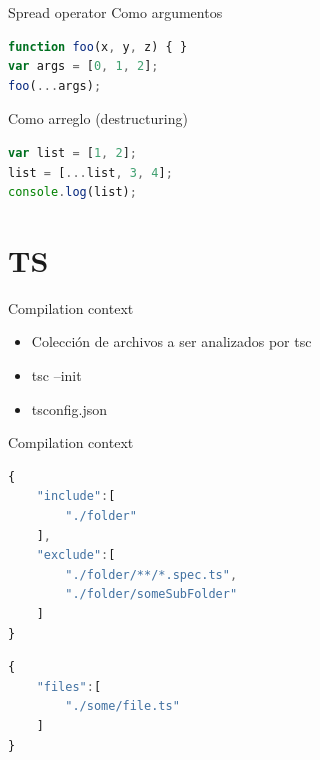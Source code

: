 \documentclass[aspectratio=169]{beamer}
\begin{document}
\begin{frame}[fragile]{Spread operator}
Como argumentos
\begin{lstlisting}[language=JavaScript,basicstyle=\scriptsize]
function foo(x, y, z) { }
var args = [0, 1, 2];
foo(...args);
\end{lstlisting}

Como arreglo (destructuring)
\begin{lstlisting}[language=JavaScript,basicstyle=\scriptsize]
var list = [1, 2];
list = [...list, 3, 4];
console.log(list);
\end{lstlisting}

\end{frame}

{
    \section{TS}
}

\begin{frame}[fragile]{Compilation context}
\begin{itemize}
	\item Colección de archivos a ser analizados por tsc
	\item tsc --init
	\item tsconfig.json
\end{itemize}
\end{frame}

\begin{frame}[fragile]{Compilation context}
\begin{lstlisting}[language=JavaScript,basicstyle=\scriptsize]
{
    "include":[
        "./folder"
    ],
    "exclude":[
        "./folder/**/*.spec.ts",
        "./folder/someSubFolder"
    ]
}
\end{lstlisting}

\begin{lstlisting}[language=JavaScript,basicstyle=\scriptsize]
{
    "files":[
        "./some/file.ts"
    ]
}
\end{lstlisting}
\end{frame}
\end{document}
